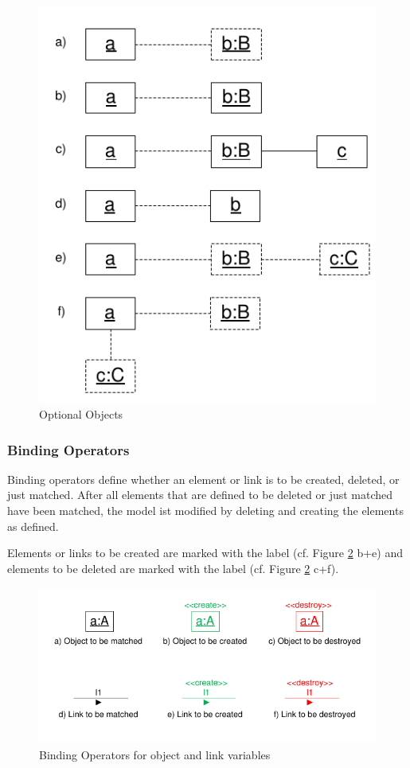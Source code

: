 \begin{figure}[htbp]
  \centering
  \includegraphics[scale=1]{figures/optionalObjects}
  \caption{Optional Objects}
  \label{fig:optionalObjects}
\end{figure}

\subsubsection{Binding Operators}
\label{sec:StoryPatterns:binding:operators}
Binding operators define whether an element or link is to be created, deleted,
or just matched.
After all elements that are defined to be deleted or just matched have been
matched, the model ist modified by deleting and creating the elements as
defined.

Elements or links to be created are marked with the
label \create (cf. Figure \ref{fig:bindingOperatorsOverview} b+e) and elements
to be deleted are marked with the label \destroy (cf. Figure
\ref{fig:bindingOperatorsOverview} c+f).

\begin{figure}[htbp]
  \centering
  \includegraphics[scale=1.2]{figures/BindingOperatorsOverview}
  \caption{Binding Operators for object and link variables}
  \label{fig:bindingOperatorsOverview}
\end{figure}

